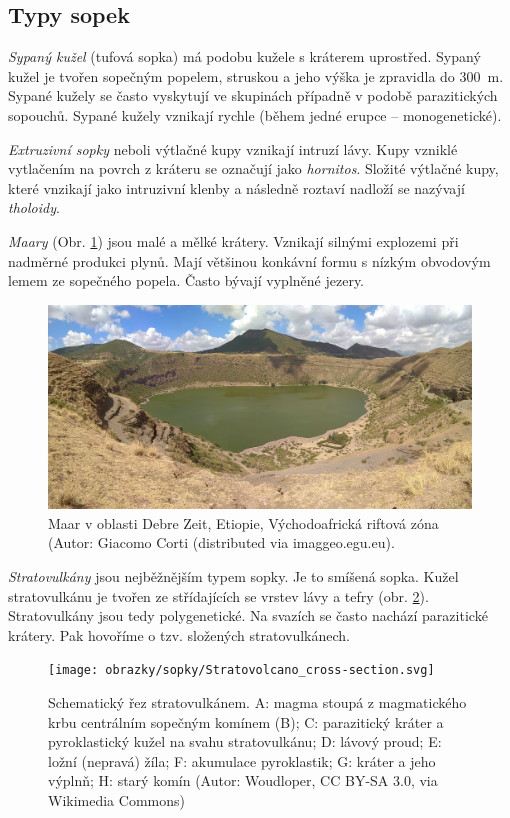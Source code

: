 \subsection{Typy sopek}
\emph{Sypaný kužel} (tufová sopka) má podobu kužele s kráterem uprostřed. Sypaný kužel je tvořen sopečným popelem,  struskou a jeho výška je zpravidla do \SI{300}{\metre}. Sypané kužely se často vyskytují ve skupinách případně v podobě parazitických sopouchů. Sypané kužely vznikají rychle (během jedné erupce -- monogenetické). 

\emph{Extruzivní sopky} neboli výtlačné kupy vznikají intruzí lávy. Kupy vzniklé vytlačením na povrch z kráteru se označují jako \emph{hornitos}. Složité výtlačné kupy, které vnzikají jako intruzivní klenby a následně roztaví nadloží se nazývají \emph{tholoidy}.

\emph{Maary} (Obr. \ref{fig:maar}) jsou malé a mělké krátery. Vznikají silnými explozemi při nadměrné produkci plynů. Mají většinou konkávní formu s nízkým obvodovým lemem ze sopečného popela. Často bývají vyplněné jezery.

\begin{figure}[h]
\includegraphics[width=\linewidth]{obrazky/sopky/maar}
\caption{Maar v oblasti Debre Zeit, Etiopie, Východoafrická riftová zóna (Autor: Giacomo Corti (distributed via imaggeo.egu.eu).}
\label{fig:maar}
\end{figure}

\emph{Stratovulkány} jsou nejběžnějším typem sopky. Je to smíšená sopka. Kužel stratovulkánu je tvořen ze střídajících se vrstev lávy a tefry (obr. \ref{fig:stratovulkan_rez}). Stratovulkány jsou tedy polygenetické. Na svazích se často nachází parazitické krátery. Pak hovoříme o tzv. složených stratovulkánech. 

\begin{figure}[h]
	\centering
	\texttt{[image: obrazky/sopky/Stratovolcano\_cross-section.svg]}
	\caption{Schematický řez stratovulkánem. A: magma stoupá z magmatického krbu centrálním sopečným komínem (B); C: parazitický kráter a pyroklastický kužel na svahu stratovulkánu; D: lávový proud; E: ložní (nepravá) žíla; F: akumulace pyroklastik; G: kráter a jeho výplnň; H: starý komín (Autor: Woudloper, CC BY-SA 3.0, via Wikimedia Commons)}
	\label{fig:stratovulkan_rez}
\end{figure}

